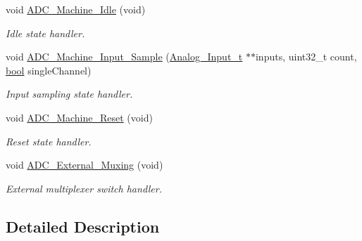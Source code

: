 \begin{DoxyCompactItemize}
void \hyperlink{group__adc__statemachine_gac1ea03f0a36d3488bfb5c728b118942c}{A\-D\-C\-\_\-\-Machine\-\_\-\-Idle} (void)
\begin{DoxyCompactList}\small\item\em Idle state handler. \end{DoxyCompactList}\item 
void \hyperlink{group__adc__statemachine_ga979620e2e4743c8f5d1f053a90705841}{A\-D\-C\-\_\-\-Machine\-\_\-\-Input\-\_\-\-Sample} (\hyperlink{struct_analog___input__t}{Analog\-\_\-\-Input\-\_\-t} $\ast$$\ast$inputs, uint32\-\_\-t count, \hyperlink{group__data__types_ga0ecf26b576b9a54eca656b9be7ba6a06}{bool} single\-Channel)
\begin{DoxyCompactList}\small\item\em Input sampling state handler. \end{DoxyCompactList}\item 
void \hyperlink{group__adc__statemachine_ga82e1537e4763ba13d894276ab9de1cd7}{A\-D\-C\-\_\-\-Machine\-\_\-\-Reset} (void)
\begin{DoxyCompactList}\small\item\em Reset state handler. \end{DoxyCompactList}\item 
void \hyperlink{group__adc__statemachine_gafdb90e36c49985480868585799f00b22}{A\-D\-C\-\_\-\-External\-\_\-\-Muxing} (void)
\begin{DoxyCompactList}\small\item\em External multiplexer switch handler. \end{DoxyCompactList}\end{DoxyCompactItemize}


\subsection{Detailed Description}


